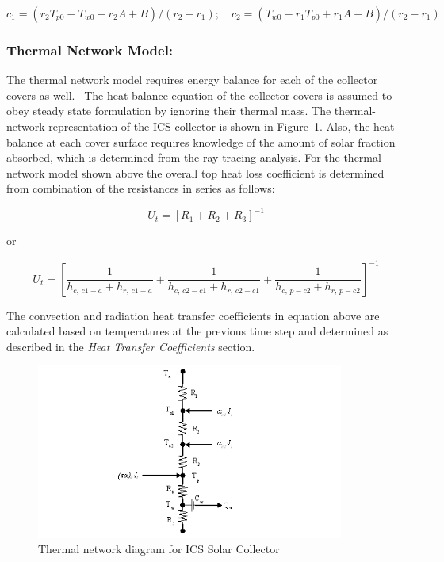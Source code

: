 \begin{equation}
{c_1} =  ({r_2}{T_{p0}} - {T_{w0}} - {r_2}A + B)/({r_2} - {r_1});\quad {c_2} =  ({T_{w0}} - {r_1}{T_{p0}} + {r_1}A - B)/({r_2} - {r_1})
\end{equation}

\subsubsection{Thermal Network Model:}\label{thermal-network-model}

The thermal network model requires energy balance for each of the collector covers as well.~ The heat balance equation of the collector covers is assumed to obey steady state formulation by ignoring their thermal mass. The thermal-network representation of the ICS collector is shown in Figure~\ref{fig:thermal-network-diagram-for-ics-solar}. Also, the heat balance at each cover surface requires knowledge of the amount of solar fraction absorbed, which is determined from the ray tracing analysis. For the thermal network model shown above the overall top heat loss coefficient is determined from combination of the resistances in series as follows:

\begin{equation}
{U_t} = {\left[ {{R_1} + {R_2} + {R_3}} \right]^{ - 1}}
\end{equation}

or

\begin{equation}
{U_t} = {\left[ {\frac{1}{{{h_{c,\,c1 - a}} + {h_{r,\,c1 - a}}}} + \frac{1}{{{h_{c,\,c2 - c1}} + {h_{r,\,c2 - c1}}}} + \frac{1}{{{h_{c,\,p - c2}} + {h_{r,\,p - c2}}}}} \right]^{ - 1}}
\end{equation}

The convection and radiation heat transfer coefficients in equation above are calculated based on temperatures at the previous time step and determined as described in the \emph{Heat Transfer Coefficients} section.

\begin{figure}[hbtp] %
\centering
\includegraphics[width=0.9\textwidth, height=0.9\textheight, keepaspectratio=true]{media/image6522.png}
\caption{Thermal network diagram for ICS Solar Collector \protect \label{fig:thermal-network-diagram-for-ics-solar}}
\end{figure}

